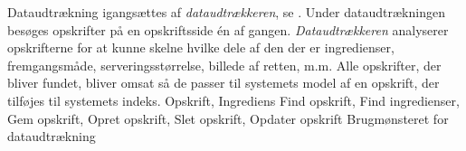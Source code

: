 {Dataudtrækning igangsættes af \textit{dataudtrækkeren}, se . Under dataudtrækningen besøges opskrifter på en opskriftsside én af gangen. \textit{Dataudtrækkeren} analyserer opskrifterne for at kunne skelne hvilke dele af den der er ingredienser, fremgangsmåde, serveringsstørrelse, billede af retten, m.m. Alle opskrifter, der bliver fundet, bliver omsat så de passer til systemets model af en opskrift, der tilføjes til systemets indeks.}
{Opskrift, Ingrediens}
{Find opskrift, Find ingredienser, Gem opskrift, Opret opskrift, Slet opskrift, Opdater opskrift}
{Brugmønsteret for dataudtrækning}
